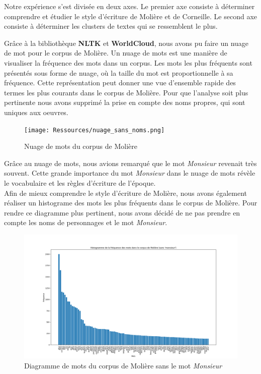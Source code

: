 \vspace{\baselineskip}

\hspace{0,5cm}Notre expérience s'est divisée en deux axes. Le premier axe
consiste à déterminer comprendre et étudier le style d'écriture de Molière et de
Corneille. Le second axe consiste à déterminer les clusters de textes qui se
ressemblent le plus.

\hspace{0,5cm}Grâce à la bibliothèque \textbf{NLTK} et \textbf{WorldCloud}, nous
avons pu faire un nuage de mot pour le corpus de Molière. Un nuage de mots est
une manière de visualiser la fréquence des mots dans un corpus. Les mots les
plus fréquents sont présentés sous forme de nuage, où la taille du mot est
proportionnelle à sa fréquence. Cette représentation peut donner une vue
d'ensemble rapide des termes les plus courants dans le corpus de Molière. Pour
que l'analyse soit plus pertinente nous avons supprimé la prise en compte des
noms propres, qui sont uniques aux oeuvres.

\begin{figure}[htbp]
    \centering
    \texttt{[image: Ressources/nuage\_sans\_noms.png]}
    \caption{Nuage de mots du corpus de Molière}
    \label{fig:images}
  \end{figure}

\vspace{\baselineskip}
\newpage
\hspace{0,5cm}Grâce au nuage de mots, nous avions remarqué que le mot
\textit{Monsieur} revenait très souvent. Cette grande importance du mot
\textit{Monsieur} dans le nuage de mots révèle le vocabulaire et les règles
d'écriture de l'époque.  \\Afin de mieux comprendre le style d'écriture de
Molière, nous avons également réaliser un histograme des mots les plus fréquents
dans le corpus de Molière.  Pour rendre ce diagramme plus pertinent, nous avons
décidé de ne pas prendre en compte les noms de personnages et le mot
\textit{Monsieur}.

\begin{figure}[htbp]
    \centering
    \includegraphics[width=13cm]{Ressources/diagr_sans_noms_mosn.png}
\caption{Diagramme de mots du corpus de Molière sans le mot \textit{Monsieur}}
    \label{fig:images}
  \end{figure}

